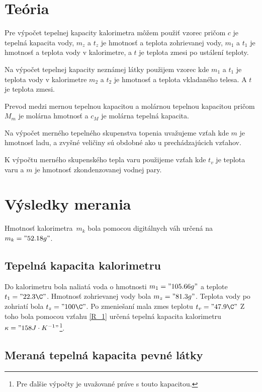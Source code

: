 \documentclass[a4paper,10pt]{article}
\begin{document}
\section{Teória}
Pre výpočet tepelnej kapacity kalorimetra môžem použiť vzorec
pričom $c$ je tepelná kapacita vody, 
$m_z$ a $t_z$ je hmotnosť a teplota zohrievanej vody,
$m_1$ a $t_1$ je hmotnosť a teplota vody v kalorimetre, a $t$ je teplota zmesi po ustálení teploty. 

Na výpočet tepelnej kapacity neznámej látky použijem vzorec 
kde $m_1$ a $t_1$ je teplota vody v kalorimetre $m_2$ a $t_2$ je hmotnosť a teplota vkladaného telesa. 
A $t$ je teplota zmesi. 

Prevod medzi mernou tepelnou kapacitou a molárnou tepelnou kapacitou
pričom $M_m$ je molárna hmotnosť a $c_M$ je molárna tepelná kapacita.


Na výpočet merného tepelného skupenstva topenia uvažujeme vzťah
kde $m$ je hmotnosť ladu, a zvyšné veličiny sú obdobné ako u prechádzajúcich vzťahov.

K výpočtu merného skupenského tepla varu použijeme vzťah
kde $t_v$ je teplota varu a $m$ je hmotnosť zkondenzovanej vodnej pary.



\section{Výsledky merania}
Hmotnosť kalorimetra~$m_k$ bola pomocou digitálnych váh určená na $m_k = "52.18 g"$.

\subsection{Tepelná kapacita kalorimetru}
Do kalorimetru bola naliatá voda o hmotnosti $m_1 = "105.66 g"$ a teplote $t_1="22.3 \C"$. 
Hmotnosť zohrievanej vody bola $m_z = "81.3 g"$.
Teplota vody po zohriatí bola $t_z = "100 \C"$.
Po zmeniešaní mala zmes teplotu $t_v = "47.9 \C" $
Z toho bola pomocou vzťahu \ref{R_1} určená tepelná kapacita kalorimetru $\kappa = "158 J \cdot K^{-1}" $\footnote{Pre ďalšie výpočty je uvažované práve s touto kapacitou.}.

\subsection{Meraná tepelná kapacita pevné látky}
\end{document}
